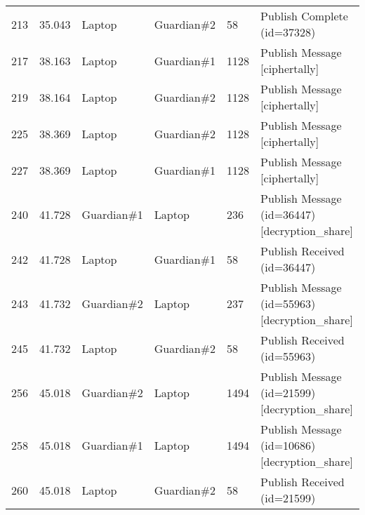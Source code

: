 \begin{table}[]
\begin{tabular}{llllll}
213 & 35.043 & Laptop      & Guardian\#2 & 58     & Publish Complete (id=37328)                                                                                                            \\
217 & 38.163 & Laptop      & Guardian\#1 & 1128   & Publish Message {[}ciphertally{]}                                                                                                      \\
219 & 38.164 & Laptop      & Guardian\#2 & 1128   & Publish Message {[}ciphertally{]}                                                                                                      \\
225 & 38.369 & Laptop      & Guardian\#2 & 1128   & Publish Message {[}ciphertally{]}                                                                                                      \\
227 & 38.369 & Laptop      & Guardian\#1 & 1128   & Publish Message {[}ciphertally{]}                                                                                                      \\
240 & 41.728 & Guardian\#1 & Laptop      & 236    & Publish Message (id=36447) {[}decryption\_share{]}                                                                                     \\
242 & 41.728 & Laptop      & Guardian\#1 & 58     & Publish Received (id=36447)                                                                                                            \\
243 & 41.732 & Guardian\#2 & Laptop      & 237    & Publish Message (id=55963) {[}decryption\_share{]}                                                                                     \\
245 & 41.732 & Laptop      & Guardian\#2 & 58     & Publish Received (id=55963)                                                                                                            \\
256 & 45.018 & Guardian\#2 & Laptop      & 1494   & Publish Message (id=21599) {[}decryption\_share{]}                                                                                     \\
258 & 45.018 & Guardian\#1 & Laptop      & 1494   & Publish Message (id=10686) {[}decryption\_share{]}                                                                                     \\
260 & 45.018 & Laptop      & Guardian\#2 & 58     & Publish Received (id=21599)                                                                                                            \\

\end{tabular}
\end{table}

